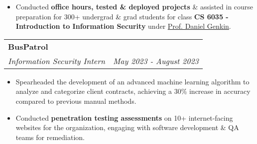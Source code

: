 \documentclass[letterpaper,11pt]{article}
\makeatletter
\newcommand{\resumeItem}[1]{
  \item\small{
    {#1 \vspace{-2pt}}
  }
}
\newcommand{\resumeSubheading}[4]{
  \vspace{-2pt}\item
    \begin{tabular*}{0.97\textwidth}[t]{l@{\extracolsep{\fill}}r}
      \textbf{#1} & #2 \\
      \textit{\small#3} & \textit{\small #4} \\
    \end{tabular*}\vspace{0pt}
}
\newcommand{\resumeItemListStart}{\begin{itemize}}
\newcommand{\resumeItemListEnd}{\end{itemize}\vspace{-5pt}}
\makeatother
\begin{document}
    \resumeItemListStart
        \resumeItem{}
        {Conducted \textbf{office hours, tested \& deployed projects} \& assisted in course preparation for 300+ undergrad \& grad students for class \textbf{CS 6035 - Introduction to Information Security} under \href{https://faculty.cc.gatech.edu/~genkin/}{Prof. Daniel Genkin}.}
    \resumeItemListEnd 

     
  
    \resumeSubheading
          {BusPatrol}{}
            {Information Security Intern}{May 2023 - August 2023}
        \resumeItemListStart
            \resumeItem{}
            {Spearheaded the development of an advanced machine learning algorithm to analyze and categorize client contracts, achieving a 30\% increase in accuracy compared to previous manual methods. }
            \resumeItem{}
            {Conducted \textbf{penetration testing assessments} on 10+ internet-facing websites for the organization, engaging with software development \& QA teams for remediation.}
        \resumeItemListEnd

    
        
\end{document}
